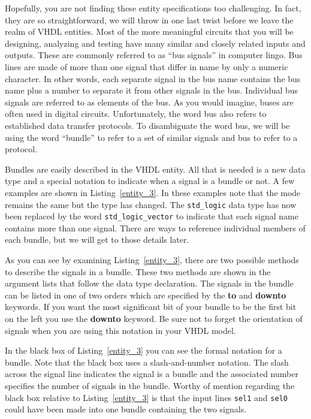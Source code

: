 Hopefully, you are not finding these entity specifications too challenging. In fact, they are so straightforward, we will throw in one last twist before we leave the realm of VHDL entities. Most of the more meaningful circuits that you will be designing, analyzing and testing have many similar and closely related inputs and outputs. These are commonly referred to as ``bus signals'' in computer lingo. Bus lines are made of more than one signal that differ in name by only a numeric character. In other words, each separate signal in the bus name contains the bus name plus a number to separate it from other signals in the bus. Individual bus signals are referred to as elements of the bus. As you would imagine, buses are often used in digital circuits. Unfortunately, the word bus also refers to established data transfer protocols. To disambiguate the word bus, we will be using the word ``bundle'' to refer to a set of similar signals and bus to refer to a protocol.

Bundles are easily described in the VHDL entity. All that is needed is a new data type and a special notation to indicate when a signal is a bundle or not. A few examples are shown in Listing~\ref{entity_3}. In these examples note that the mode remains the same but the type has changed. The \texttt{std\_logic} data type has now been replaced by the word \texttt{std\_logic\_vector} to indicate that each signal name contains more than one signal. There are ways to reference individual members of each bundle, but we will get to those details later.

As you can see by examining Listing~\ref{entity_3}, there are two possible methods to describe the signals in a bundle. These two methods are shown in the argument lists that follow the data type declaration. The signals in the bundle can be listed in one of two orders which are specified by the \textbf{to} and \textbf{downto} keywords. If you want the most significant bit of your bundle to be the first bit on the left you use the \textbf{downto} keyword. Be sure not to forget the orientation of signals when you are using this notation in your VHDL model.

In the black box of Listing~\ref{entity_3} you can see the formal notation for a bundle. Note that the black box uses a slash-and-number notation. The slash across the signal line indicates the signal is a bundle and the associated number specifies the number of signals in the bundle. Worthy of mention regarding the black box relative to Listing~\ref{entity_3} is that the input lines \texttt{sel1} and \texttt{sel0} could have been made into one bundle containing the two signals.

